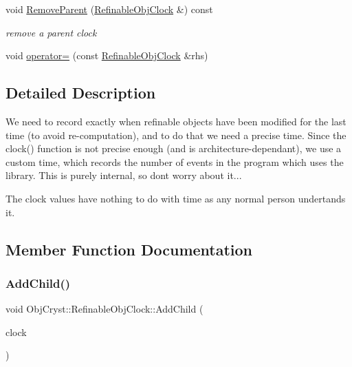 \begin{DoxyCompactItemize}
\mbox{\label{class_obj_cryst_1_1_refinable_obj_clock_a918e6d51a1290b2141cf4b8d7c8cb3f0}} 
void \mbox{\hyperlink{class_obj_cryst_1_1_refinable_obj_clock_a918e6d51a1290b2141cf4b8d7c8cb3f0}{Remove\+Parent}} (\mbox{\hyperlink{class_obj_cryst_1_1_refinable_obj_clock}{Refinable\+Obj\+Clock}} \&) const
\begin{DoxyCompactList}\small\item\em remove a parent clock \end{DoxyCompactList}\item 
void \mbox{\hyperlink{class_obj_cryst_1_1_refinable_obj_clock_a91eda9a56505c36e5f060672e4959a58}{operator=}} (const \mbox{\hyperlink{class_obj_cryst_1_1_refinable_obj_clock}{Refinable\+Obj\+Clock}} \&rhs)
\end{DoxyCompactItemize}


\subsection{Detailed Description}
We need to record exactly when refinable objects have been modified for the last time (to avoid re-\/computation), and to do that we need a precise time. Since the clock() function is not precise enough (and is architecture-\/dependant), we use a custom time, which records the number of events in the program which uses the library. This is purely internal, so don\textquotesingle{}t worry about it...

The clock values have nothing to do with \textquotesingle{}time\textquotesingle{} as any normal person undertands it. 

\subsection{Member Function Documentation}
\mbox{\label{class_obj_cryst_1_1_refinable_obj_clock_a4be5b7b2f802d67000098a89939ffaf1}} 
\subsubsection{\texorpdfstring{AddChild()}{AddChild()}}
{\footnotesize\ttfamily void Obj\+Cryst\+::\+Refinable\+Obj\+Clock\+::\+Add\+Child (\begin{DoxyParamCaption}\item[{const \mbox{\hyperlink{class_obj_cryst_1_1_refinable_obj_clock}{Refinable\+Obj\+Clock}} \&}]{clock }\end{DoxyParamCaption})}

